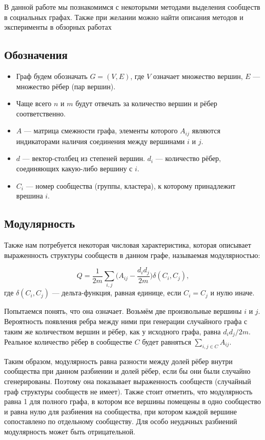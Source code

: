 \documentclass[12pt]{article}
\begin{document}
В данной работе мы познакомимся с некоторыми методами выделения сообществ в социальных графах. Также при желании можно найти описания методов и эксперименты в обзорных работах \cite{overview, slavnov, overlapping_overview}

\subsection{Обозначения}
\begin{itemize}
\item Граф будем обозначать $G = (V, E)$, где $V$ означает множество вершин, $E$ --- множество рёбер (пар вершин). 
\item Чаще всего $n$ и $m$ будут отвечать за количество вершин и рёбер соответственно. 
\item $A$ --- матрица смежности графа, элементы которого $A_{ij}$ являются индикаторами наличия соединения между вершинами $i$ и $j$. 
\item $d$ --- вектор-столбец из степеней вершин. $d_i$ --- количество рёбер, соединяющих какую-либо вершину с $i$.
\item $C_i$ --- номер сообщества (группы, кластера), к которому принадлежит врешина $i$.
\end{itemize}

\subsection{Модулярность}

Также нам потребуется некоторая числовая характеристика, которая описывает выраженность структуры сообществ в данном графе, называемая модулярностью:

\[
Q = \frac{1}{2m}\sum_{i,j}\biggl(A_{ij}-\frac{d_i d_j}{2m}\biggr)\delta(C_i, C_j),
\]
где $\delta(C_i, C_j)$ --- дельта-функция, равная единице, если $C_i = C_j$ и нулю иначе.

Попытаемся понять, что она означает. Возьмём две произвольные вершины $i$ и $j$. Вероятность появления ребра между ними при генерации случайного графа с таким же количеством вершин и рёбер, как у исходного графа, равна ${d_i d_j}/{2m}$. Реальное количество рёбер в сообществе $C$ будет равняться $\sum_{i,j \in C}A_{ij}$.

Таким образом, модулярность равна разности между долей рёбер внутри сообщества при данном разбиении и долей рёбер, если бы они были случайно сгенерированы. Поэтому она показывает выраженность сообществ (случайный граф структуры сообществ не имеет). Также стоит отметить, что модулярность равна 1 для полного графа, в котором все вершины помещены в одно сообщество и равна нулю для разбиения на сообщества, при котором каждой вершине сопоставлено по отдельному сообществу. Для особо неудачных разбиений модулярность может быть отрицательной.
\end{document}
